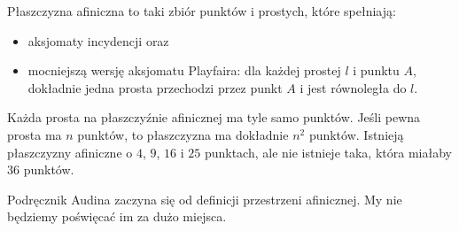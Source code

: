 \begin{proposition}
    Płaszczyzna afiniczna to taki zbiór punktów i prostych, które spełniają: 
    \begin{itemize}
        \item aksjomaty incydencji oraz
        \item mocniejszą wersję aksjomatu Playfaira: dla każdej prostej $l$ i punktu $A$, dokładnie jedna prosta przechodzi przez punkt $A$ i jest równoległa do $l$.
    \end{itemize}
    Każda prosta na płaszczyźnie afinicznej ma tyle samo punktów.
    Jeśli pewna prosta ma $n$ punktów, to płaszczyzna ma dokładnie $n^2$ punktów.
    Istnieją płaszczyzny afiniczne o $4$, $9$, $16$ i $25$ punktach, ale nie istnieje taka, która miałaby $36$ punktów.
\end{proposition} %

Podręcznik Audina \cite[s. 7]{audin_2003} zaczyna się od definicji przestrzeni afinicznej.
My nie będziemy poświęcać im za dużo miejsca.

%